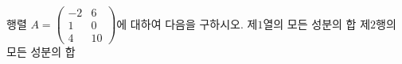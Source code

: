 행렬 $A=\begin{pmatrix} -2 & 6 \\ 1 & 0 \\ 4 & 10 \end{pmatrix}$에 대하여 다음을 구하시오.
 제$1$열의 모든 성분의 합
 제$2$행의 모든 성분의 합
